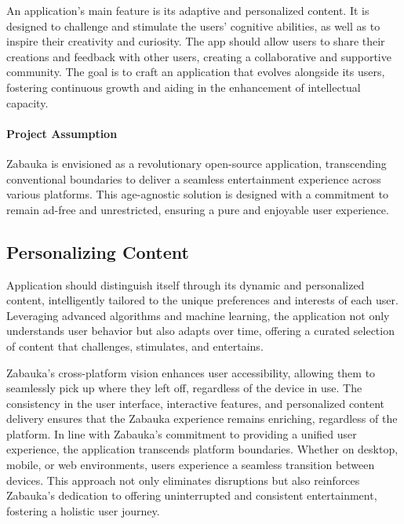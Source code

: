 
An application's main feature is its adaptive and personalized content. It is designed to challenge and stimulate the 
users' cognitive abilities, as well as to inspire their creativity and curiosity. The app should allow users to share 
their creations and feedback with other users, creating a collaborative and supportive community. The goal is to craft 
an application that evolves alongside its users, fostering continuous growth and aiding in the enhancement of 
intellectual capacity.

\paragraph{Project Assumption} Zabauka is envisioned as a revolutionary open-source application, transcending 
conventional boundaries to deliver a seamless entertainment experience across various platforms. This age-agnostic 
solution is designed with a commitment to remain ad-free and unrestricted, ensuring a pure and enjoyable user experience.


\subsection{Personalizing Content}

Application should distinguish itself through its dynamic and personalized content, intelligently tailored to the 
unique preferences and interests of each user. Leveraging advanced algorithms and machine learning, the application 
not only understands user behavior but also adapts over time, offering a curated selection of content that challenges, 
stimulates, and entertains.

Zabauka's cross-platform vision enhances user accessibility, allowing them to seamlessly pick up where they left off, 
regardless of the device in use. The consistency in the user interface, interactive features, and personalized content 
delivery ensures that the Zabauka experience remains enriching, regardless of the platform.
In line with Zabauka's commitment to providing a unified user experience, the application transcends platform boundaries. 
Whether on desktop, mobile, or web environments, users experience a seamless transition between devices. This approach 
not only eliminates disruptions but also reinforces Zabauka's dedication to offering uninterrupted and consistent 
entertainment, fostering a holistic user journey.


